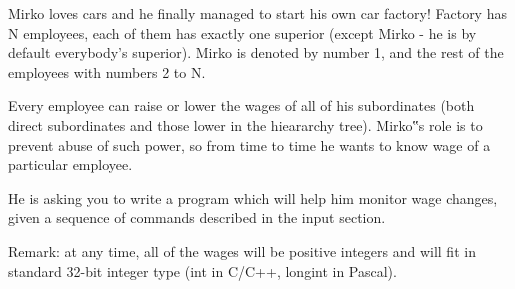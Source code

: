 Mirko loves cars and he finally managed to start his own car factory! Factory has N employees, each of them has exactly one superior (except Mirko - he is by default everybody's superior). Mirko is denoted by number 1, and the rest of the employees with numbers 2 to N.




Every employee can raise or lower the wages of all of his subordinates (both direct subordinates and those lower in the hieararchy tree). Mirko‟s role is to prevent abuse of such power, so from time to time he wants to know wage of a particular employee.


He is asking you to write a program which will help him monitor wage changes, given a sequence of commands described in the input section.

Remark: at any time, all of the wages will be positive integers and will fit in standard 32-bit integer type (int in C/C++, longint in Pascal).